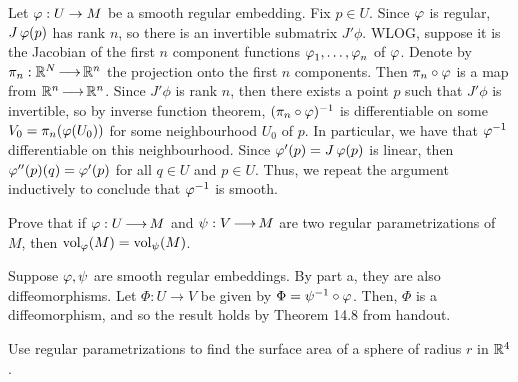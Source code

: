 \begin{soln}
    Let $ \operatorname{\varphi}:U \rightarrow M $ be a smooth regular embedding.
    Fix $ p \in U $. Since $ \operatorname{\varphi} $ is regular, $ J\operatorname{\varphi}(p) $ has rank $ n $,
    so there is an invertible submatrix $ J'\phi $. WLOG, suppose it is the
    Jacobian of the first $ n $ component functions $ \operatorname{\varphi}_{1}, \dots,
    \operatorname{\varphi}_{n} $ of $ \operatorname{\varphi} $. \vsp
    Denote by $ \pi_{n}: \mathbb{R}^{N} \operatorname{\longrightarrow} \mathbb{R}^{n} $ the projection onto the first
    $ n $ components. Then $ \pi_{n}\circ\operatorname{\varphi} $ is a map from $ \mathbb{R}^{n} \operatorname{\longrightarrow}
    \mathbb{R}^{n} $. Since $ J'\phi $ is rank $ n $, then there exists a point $ p $
    such that $ J'\phi $ is invertible, so by inverse function theorem,
    $ (\pi_{n}\circ\operatorname{\varphi})^{-1} $ is differentiable on some
    $ V_{0} = \pi_{n}(\operatorname{\varphi}(U_{0})) $ for some neighbourhood $ U_{0} $ of $ p $.
    In particular, we have that $ \operatorname{\varphi}^{-1} $ differentiable on this
    neighbourhood. \vsp
    Since $ \operatorname{\varphi}'(p) = J\operatorname{\varphi}(p) $ is linear, then $ \operatorname{\varphi}''(p)(q) = \operatorname{\varphi}'(p) $
    for all $ q \in U $ and $ p \in U $. Thus, we repeat the argument inductively
    to conclude that $ \operatorname{\varphi}^{-1} $ is smooth.
\end{soln}

\begin{qu}[num=39.2]
    Prove that if $ \operatorname{\varphi}:U \operatorname{\longrightarrow} M $ and $ \psi: V \operatorname{\longrightarrow} M $ are two regular
    parametrizations of $ M $, then $ \operatorname{vol}_{\operatorname{\varphi}}(M) = \operatorname{vol}_{\psi}(M) $.
\end{qu}

\begin{soln}
    Suppose $ \operatorname{\varphi}, \psi $ are smooth regular embeddings.
    By part a, they are also diffeomorphisms. \vsp
    Let $ \Phi: U \rightarrow V $ be given by $ \Phi = \psi^{-1} \circ \operatorname{\varphi} $.
    Then, $ \Phi $ is a diffeomorphism, and so the result holds by Theorem 14.8
    from handout.
\end{soln}

\begin{qu}[num=39.3]
    Use regular parametrizations to find the surface area of a sphere of radius
    $ r $ in $ \mathbb{R}^{4} $.
\end{qu}

